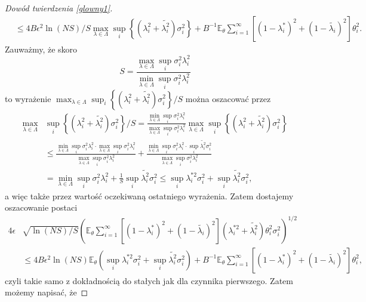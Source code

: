 \documentclass[man,mfiu]{mgrwms}
\begin{document}
\begin{proof}[Dowód twierdzenia \ref{glowny1}]
\begin{displaymath}
\begin{split}
&\leq 4B\epsilon^2\ln (NS)/S\max_{\lambda\in \Lambda}\sup_i\left\{(\lambda_i^{2}+\tilde{\lambda_i^2})\sigma_i^2\right\}+B^{-1}\mathbb{E}_{\theta}\sum_{i=1}^{\infty}[(1-\lambda_i^*)^2+(1-\tilde{\lambda_i})^2]\theta_i^2.
\end{split}
\end{displaymath}
Zauważmy, że skoro
\begin{displaymath}
S=\frac{\max_{\lambda\in\Lambda}\sup_i\sigma_i^2\lambda_i^2}{\min_{\lambda\in\Lambda}\sup_i\sigma_i^2\lambda_i^2}
\end{displaymath}
to wyrażenie $\max_{\lambda\in \Lambda}\sup_i\left\{(\lambda_i^{2}+\tilde{\lambda_i^2})\sigma_i^2\right\}/S$ można oszacować przez
\begin{displaymath}
\begin{split}
\max_{\lambda\in \Lambda}&\sup_i\left\{(\lambda_i^{2}+\tilde{\lambda_i^2})\sigma_i^2\right\}/S=\frac{\min_{\lambda\in\Lambda}\sup_i\sigma_i^2\lambda_i^2}{\max_{\lambda\in\Lambda}\sup_i\sigma_i^2\lambda_i^2}\max_{\lambda\in \Lambda}\sup_i\left\{(\lambda_i^{2}+\tilde{\lambda_i^2})\sigma_i^2\right\}\\
&\leq \frac{\min_{\lambda\in\Lambda}\sup_i\sigma_i^2\lambda_i^2\cdot \max_{\lambda\in\Lambda}\sup_i\sigma_i^2\lambda_i^2}{\max_{\lambda\in\Lambda}\sup_i\sigma_i^2\lambda_i^2}+\frac{\min_{\lambda\in\Lambda}\sup_i\sigma_i^2\lambda_i^2\cdot \sup_i\tilde{\lambda_i^2}\sigma_i^2}{\max_{\lambda\in\Lambda}\sup_i\sigma_i^2\lambda_i^2}\\
&=\min_{\lambda\in\Lambda}\sup_i\sigma_i^2\lambda_i^2+\frac{1}{S}\sup_i\tilde{\lambda_i^2}\sigma_i^2\leq\sup_i\lambda_i^{*2}\sigma_i^2+\sup_i\tilde{\lambda_i^2}\sigma_i^2,
\end{split}
\end{displaymath}
a więc także przez wartość oczekiwaną ostatniego wyrażenia. Zatem dostajemy oszacowanie postaci
\begin{displaymath}
\begin{split}
4\epsilon&\sqrt{\ln (NS)/S}\left(\mathbb{E}_{\theta}\sum_{i=1}^{\infty}[(1-\lambda_i^*)^2+(1-\tilde{\lambda_i})^2](\lambda_i^{*2}+\tilde{\lambda_i^2})\theta_i^2\sigma_i^2\right)^{1/2}\\
&\leq 4B\epsilon^2 \ln (NS)\mathbb{E}_{\theta}\left(\sup_i\lambda_i^{*2}\sigma_i^2+\sup_i\tilde{\lambda_i^2}\sigma_i^2\right)+B^{-1}\mathbb{E}_{\theta}\sum_{i=1}^{\infty}[(1-\lambda_i^*)^2+(1-\tilde{\lambda_i})^2]\theta_i^2,
\end{split}
\end{displaymath}
czyli takie samo z dokładnością do stałych jak dla czynnika pierwszego. Zatem możemy napisać, że 

\end{proof}
\end{document}
